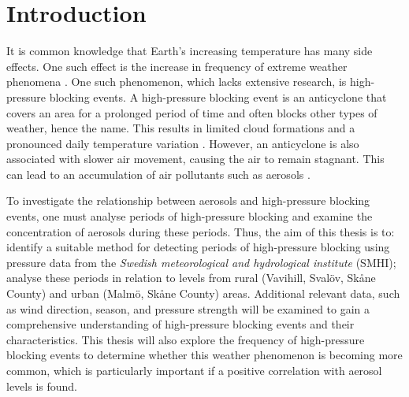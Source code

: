 \section{Introduction}
It is common knowledge that Earth's increasing temperature has many side effects. One such effect is the increase in frequency of extreme weather phenomena \cite{mitchellExtremeEventsDue2006}. One such phenomenon, which lacks extensive research, is high-pressure blocking events. A high-pressure blocking event is an anticyclone that covers an area for a prolonged period of time and often blocks other types of weather, hence the name. This results in limited cloud formations and a pronounced daily temperature variation \cite{lupoAtmosphericBlockingEvents2020}. However, an anticyclone is also associated with slower air movement, causing the air to remain stagnant. This can lead to an accumulation of air pollutants such as aerosols \cite{caiImpactBlockingStructure2020}.

To investigate the relationship between aerosols and high-pressure blocking events, one must analyse periods of high-pressure blocking and examine the concentration of aerosols during these periods. Thus, the aim of this thesis is to: identify a suitable method for detecting periods of high-pressure blocking using pressure data from the \textit{Swedish meteorological and hydrological institute} (SMHI); analyse these periods in relation to \PM levels from rural (Vavihill, Svalöv, Skåne County) and urban (Malmö, Skåne County) areas. Additional relevant data, such as wind direction, season, and pressure strength will be examined to gain a comprehensive understanding of high-pressure blocking events and their characteristics. This thesis will also explore the frequency of high-pressure blocking events to determine whether this weather phenomenon is becoming more common, which is particularly important if a positive correlation with aerosol levels is found. 
